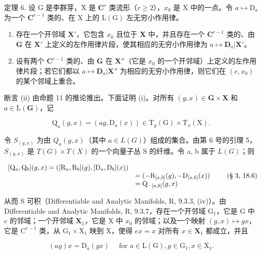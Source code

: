 定理 6. 设 G 是李群芽，X 是 \(\mathbf{C}^r\) 类流形（\(r \geqslant 2\)），\(x_0\) 是 X 中的一点。令 \(a \mapsto \mathrm{D}_a\) 为一个 \(\mathbf{C}^{r-1}\) 类的、在 X 上的 \(\mathrm{L(G)}\) 左无穷小作用律。

\begin{enumerate}
\def\labelenumi{(\roman{enumi})}
\item
  存在一个开邻域 \(\mathbf{X}'\)，它包含 \(x_0\) 且位于 \(\mathbf{X}\) 中，并且存在一个 \(\mathbf{C}^{r-1}\) 类的、由 \(\mathbf{G}\) 在 \(\mathbf{X}'\) 上定义的左作用律片段，使其相应的无穷小作用律为 \(a \mapsto \mathbf{D}_a|\mathbf{X}'\)。
\item
 设有两个 \(\mathbf{C}^{r-1}\) 类的、由 \(\mathbf{G}\) 在 \(\mathbf{X}''\)（它是 \(x_0\) 的一个开邻域）上定义的左作用律片段；若它们都以 \(a \mapsto \mathbf{D}_a|\mathbf{X}''\) 为相应的无穷小作用律，则它们在 \((e, x_0)\) 的某个邻域上重合。
\end{enumerate}

断言 (ii) 由命题 11 的推论推出。下面证明 (i)。对所有 \((g, x) \in \mathbf{G} \times \mathbf{X}\) 和 \(a \in \mathrm{L}(\mathbf{G})\)，记

\[
\mathrm{Q} _ {a} (g, x) = (a g, \mathrm{D} _ {a} (x)) \in \mathrm{T} _ {g} (\mathrm{G}) \times \mathrm{T} _ {x} (\mathrm{X}).
\]

令 \(S_{(g,x)}\) 为由 \(Q_{a}(g,x)\)（其中 \(a\in L(G)\)）组成的集合。由第 6 号的引理 5，\(S_{(g,x)}\) 是 \(T(G)\times T(X)\) 的一个向量子丛 S 的纤维。令 a, b 属于 \(L(G)\)；则

\[
\begin{array}{r l} {[ \mathrm{Q} _ {a}, \mathrm{Q} _ {b} ] (g, x) = ([ \mathrm{R} _ {a}, \mathrm{R} _ {b} ] (g), [ \mathrm{D} _ {a}, \mathrm{D} _ {b} ] (x))} \\ & = (- \mathrm{R} _ {[ a, b ]} (g), - \mathrm{D} _ {[ a, b ]} (x)) \\ & = \mathrm{Q} _ {- [ a, b ]} (g, x) \end{array}\tag{§ 3, 18.6}
\]

从而 S 可积（Differentiable and Analytic Manifolds, R, 9.3.3, (iv)）。由 Differentiable and Analytic Manifolds, R, 9.3.7，存在一个开邻域 \(\mathrm{G}_1\)，它是 G 中 \(e\) 的邻域；一个开邻域 \(\mathbf{X}_1\)，它是 X 中 \(x_0\) 的邻域；以及一个映射 \((g,x)\mapsto gx\)，它是 \(\mathrm{C}^{r - 1}\) 类，从 \(\mathrm{G}_1\times \mathrm{X}_1\) 映到 X，使得 \(ex = x\) 对所有 \(x\in \mathbf{X}_1\) 都成立，并且

\[
(a g) x = \mathrm{D} _ {a} (g x) \quad \text { for } a \in \mathrm{L} (\mathrm{G}), g \in \mathrm{G} _ {1}, x \in \mathrm{X} _ {1}.\tag{6}
\]

